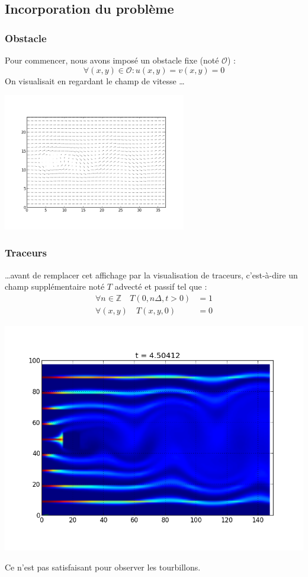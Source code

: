 \documentclass{beamer}
\renewcommand{\O}{\mathcal{O}}
\begin{document}
  \subsection{Incorporation du problème}
  \begin{frame}
    \frametitle{Obstacle}
    Pour commencer, nous avons imposé un obstacle fixe (noté $\O$) :
    \[ \forall (x,y) \in \O : u(x,y) = v(x,y) = 0 \]
    On visualisait en regardant le champ de vitesse \dots
    \begin{center}
      \includegraphics[width=0.6\textwidth]{quiver.png}
    \end{center}
  \end{frame}
  \begin{frame}
    \frametitle{Traceurs}
    \dots avant de remplacer cet affichage par la visualisation de
    traceurs, c'est-à-dire un champ supplémentaire noté $T$ advecté et
    passif tel que :
    \begin{align*}
      \forall n\in \mathbb{Z}\quad T(0,n \Delta, t>0) & = 1\\
      \forall (x,y)\quad T(x,y,0) & = 0
    \end{align*}
    \begin{center}
      \includegraphics[height=0.6\textheight]{tracer0.png}
    \end{center}
    Ce n'est pas satisfaisant pour observer les tourbillons.
  \end{frame}
  
\end{document}
